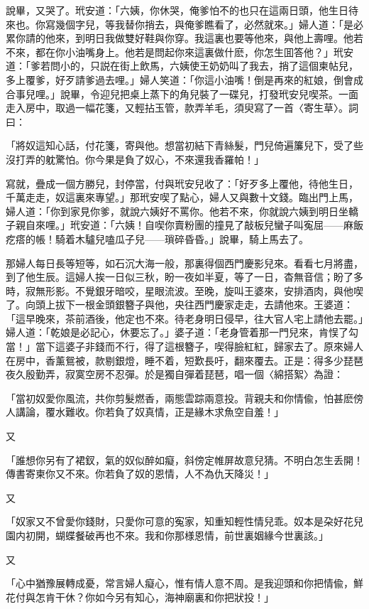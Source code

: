說畢，又哭了。玳安道：「六姨，你休哭，俺爹怕不的也只在這兩日頭，他生日待來也。你寫幾個字兒，等我替你捎去，與俺爹瞧看了，必然就來。」婦人道：「是必累你請的他來，到明日我做雙好鞋與你穿。我這裏也要等他來，與他上壽哩。他若不來，都在你小油嘴身上。他若是問起你來這裏做什麽，你怎生囬答他？」玳安道：「爹若問小的，只説在街上飲馬，六姨使王奶奶叫了我去，捎了這個柬帖兒，多上覆爹，好歹請爹過去哩。」婦人笑道：「你這小油嘴！倒是再來的紅娘，倒會成合事兒哩。」說畢，令迎兒把桌上蒸下的角兒裝了一碟兒，打發玳安兒喫茶。一面走入房中，取過一幅花箋，又輕拈玉管，款弄羊毛，須臾寫了一首〈寄生草〉。詞曰：

「將奴這知心話，付花箋，寄與他。想當初結下青絲髮，門兒倚遍簾兒下，受了些沒打弄的躭驚怕。你今果是負了奴心，不來還我香羅帕！」

寫就，疊成一個方勝兒，封停當，付與玳安兒收了：「好歹多上覆他，待他生日，千萬走走，奴這裏來專望。」那玳安喫了點心，婦人又與數十文錢。臨出門上馬，婦人道：「你到家見你爹，就說六姨好不罵你。他若不來，你就說六姨到明日坐轎子親自來哩。」玳安道：「六姨！自喫你賣粉團的撞見了敲板兒蠻子叫寃屈——麻飯疙瘩的帳！騎着木驢兒嗑瓜子兒——瑣碎昏昏。」說畢，騎上馬去了。

那婦人每日長等短等，如石沉大海一般，那裏得個西門慶影兒來。看看七月將盡，到了他生辰。這婦人挨一日似三秋，盼一夜如半夏，等了一日，杳無音信；盼了多時，寂無形影。不覺銀牙暗咬，星眼流波。至晚，旋叫王婆來，安排酒肉，與他喫了。向頭上拔下一根金頭銀簪子與他，央往西門慶家走走，去請他來。王婆道：「這早晚來，茶前酒後，他定也不來。待老身明日侵早，往大官人宅上請他去罷。」婦人道：「乾娘是必記心，休要忘了。」婆子道：「老身管着那一門兒來，肯悮了勾當！」當下這婆子非錢而不行，得了這根簪子，喫得臉紅紅，歸家去了。原來婦人在房中，香薰鴛被，款剔銀燈，睡不着，短歎長吁，翻來覆去。正是：得多少琵琶夜久殷勤弄，寂寞空房不忍彈。於是獨自彈着琵琶，唱一個〈綿搭絮〉為證：

「當初奴愛你風流，共你剪髮燃香，兩態雲踪兩意投。背親夫和你情偸，怕甚麽傍人講論，覆水難收。你若負了奴真情，正是緣木求魚空自羞！」

又

「誰想你另有了裙釵，氣的奴似醉如癡，斜傍定帷屏故意兒猜。不明白怎生丢開！傳書寄柬你又不來。你若負了奴的恩情，人不為仇天降災！」

又

「奴家又不曾愛你錢財，只愛你可意的寃家，知重知輕性情兒乖。奴本是朶好花兒園内初開，蝴蝶餐破再也不來。我和你那様恩情，前世裏姻緣今世裏該。」

又

「心中猶豫展轉成憂，常言婦人癡心，惟有情人意不周。是我迎頭和你把情偸，鮮花付與怎肯干休？你如今另有知心，海神廟裏和你把狀投！」

